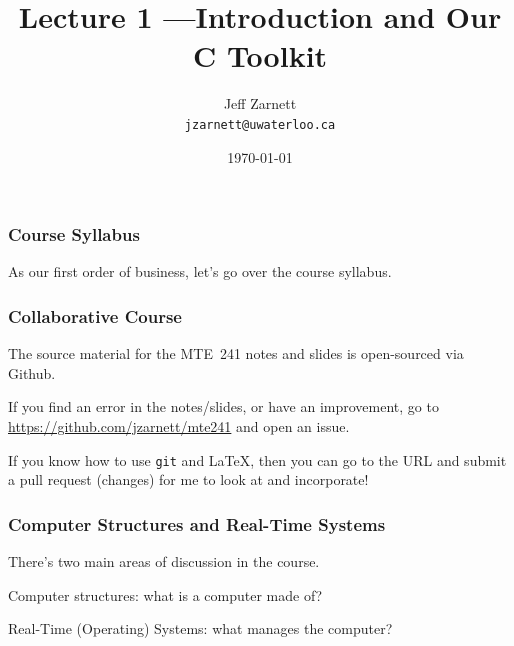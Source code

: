 

\title{Lecture 1 ---Introduction and Our C Toolkit }

\author{Jeff Zarnett \\ \small \texttt{jzarnett@uwaterloo.ca}}
\date{\today}




\begin{frame}
	\titlepage

\end{frame}

\begin{frame}
	\frametitle{Course Syllabus}

	As our first order of business, let's go over the course syllabus.

\end{frame}

\begin{frame}
	\frametitle{Collaborative Course}

	The source material for the MTE~241 notes and slides is open-sourced via Github.

	If you find an error in the notes/slides, or have an improvement, go to \url{https://github.com/jzarnett/mte241} and open an issue.

	If you know how to use \texttt{git} and \LaTeX, then you can go to the URL and submit a pull request (changes) for me to look at and incorporate!


\end{frame}

\begin{frame}
\frametitle{Computer Structures and Real-Time Systems}

There's two main areas of discussion in the course.

Computer structures: what is a computer made of?

Real-Time (Operating) Systems: what manages the computer? 

\end{frame}

